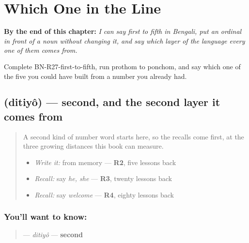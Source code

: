 
\chapter{Which One in the Line}
\label{ch:bn-ordinals}

\begin{chapteropening}
\textbf{By the end of this chapter:} \emph{I can say first to fifth in Bengali, put an ordinal in front of a noun without changing it, and say which layer of the language every one of them comes from.}

Complete BN-R27-first-to-fifth, run prothom to ponchom, and say which one of the five you could have built from a number you already had.
\end{chapteropening}

\section[\texorpdfstring{\bn{দ্বিতীয়} (ditiyô)}{দ্বিতীয় (ditiyô)}]{ (ditiyô) — second, and the second layer it comes from}

\label{lesson:BN-C27-ditiyo}



\begin{quote}
A second kind of number word starts here, so the recalls come first, at the three growing distances this book can measure.

\begin{itemize}
\raggedright
  \item \emph{Write it:} \textbf{} from memory — \textbf{R2}, five lessons back
  \item \emph{Recall:} say \emph{he, she} — \textbf{R3}, twenty lessons back
  \item \emph{Recall:} say \emph{welcome} — \textbf{R4}, eighty lessons back
\end{itemize}
\end{quote}

\subsection*{You'll want to know: }
\begin{quote}
\textbf{} — \emph{ditiyô} — \textbf{second}
\end{quote}

